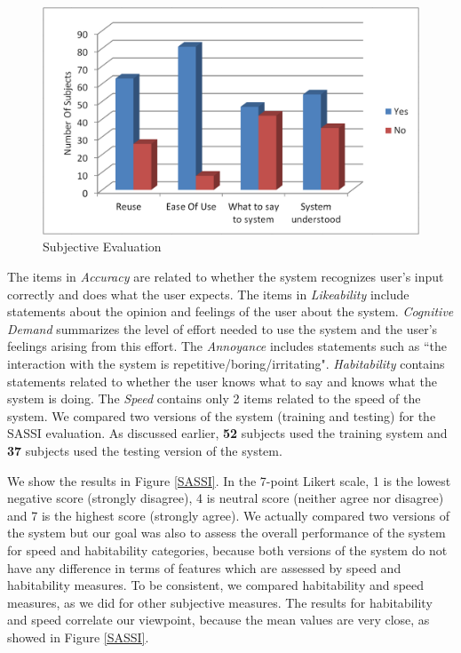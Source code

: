 \begin{sloppy}
 \begin{figure}
 \centering
 \includegraphics[width=\columnwidth]{img/subjective.png}
 \caption{Subjective Evaluation}
 \label{yesNoEva}
 \end{figure}
 

The items in \textit{Accuracy} are related to whether the system recognizes user's input correctly and does what the user expects. 
The items in {\em Likeability} include statements about the opinion and feelings of the user about the system. \textit{Cognitive Demand} summarizes the level of effort needed to use the system and the user's feelings arising from this effort. The \textit{Annoyance} includes statements such as ``the interaction with the system is repetitive/boring/irritating". \textit{Habitability} contains statements related to whether the user knows what to say and knows what the system is doing. The \textit{Speed} contains only 2 items related to the speed of the system. 
We compared two versions of the system (training and testing) for the SASSI evaluation. As discussed earlier, \textbf{52} subjects used the training system and \textbf{37} subjects used the testing version of the system.

We show the results in Figure \ref{SASSI}. In the 7-point Likert scale, 1 is the lowest negative score (strongly disagree), 4 is neutral score (neither agree nor disagree) and 7 is the highest score (strongly agree).  
We actually compared two versions of the system but our goal was also to assess the overall performance of the system for speed and habitability categories, because both versions of the system do not have any difference in terms of features which are assessed by speed and habitability measures. To be consistent, we compared habitability and speed measures, as we did for other subjective measures. The results for habitability and speed correlate our viewpoint, because the mean values are very close, as showed in Figure \ref{SASSI}.



\end{sloppy}
